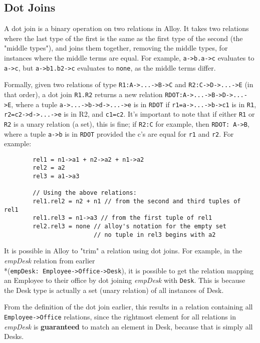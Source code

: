 \documentclass[10pt]{article}
\begin{document}
    \subsection*{Dot Joins}
      A dot join is a binary operation on two relations in Alloy. It takes two relations where the last type of the first is the same as the first type of the second (the "middle types"), and joins them together, removing the middle types, for instances where the middle terms are equal. For example, \lstinline|a->b.a->c| evaluates to \lstinline|a->c|, but \lstinline|a->b1.b2->c| evaluates to \lstinline|none|, as the middle terms differ.\par
      Formally, given two relations of type \lstinline|R1:A->...->B->C| and \lstinline|R2:C->D->...->E| (in that order), a dot join \lstinline|R1.R2| returns a new relation \lstinline|RDOT:A->...->B->D->...->E|, where a tuple \lstinline|a->...->b->d->...->e| is in \lstinline|RDOT| if \lstinline|r1=a->...->b->c1| is in \lstinline|R1|, \lstinline|r2=c2->d->...->e| is in R2, and \lstinline|c1=c2|. It's important to note that if either \lstinline|R1| or \lstinline|R2| is a unary relation (a set), this is fine; if \lstinline|R2:C| for example, then \lstinline|RDOT: A->B|, where a tuple \lstinline|a->b| is in \lstinline|RDOT| provided the c's are equal for \lstinline|r1| and \lstinline|r2|. For example:
      \begin{verbatim}
        rel1 = n1->a1 + n2->a2 + n1->a2
        rel2 = a2
        rel3 = a1->a3

        // Using the above relations:
        rel1.rel2 = n2 + n1 // from the second and third tuples of rel1
        rel1.rel3 = n1->a3 // from the first tuple of rel1
        rel2.rel3 = none // alloy's notation for the empty set
                         // no tuple in rel3 begins with a2
      \end{verbatim}
      It is possible in Alloy to "trim" a relation using dot joins. For example, in the \textit{empDesk} relation from earlier\\*(\lstinline|empDesk: Employee->Office->Desk|), it is possible to get the relation mapping an Employee to their office by dot joining \textit{empDesk} with \lstinline|Desk|. This is because the Desk type is actually a set (unary relation) of all instances of Desk.\par
      From the definition of the dot join earlier, this results in a relation containing all \lstinline|Employee->Office| relations, since the rightmost element for all relations in \textit{empDesk} is \textbf{guaranteed} to match an element in Desk, because that is simply all Desks.
\end{document}
